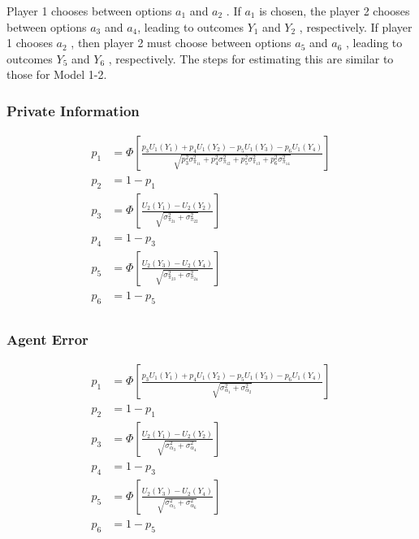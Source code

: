 \documentclass{article}
\begin{document}
    Player 1 chooses between options $a_{1}$ and $a_{2}$ . If $a_{1}$ is chosen, the player 2 chooses between
options $a_{3}$ and $a_{4}$, leading to outcomes $Y_{1}$ and $Y_{2}$ , respectively. If player 1 chooses $a_{2}$ , then player
2 must choose between options $a_{5}$ and $a_{6}$ , leading to outcomes $Y_{5}$ and $Y_{6}$ , respectively. The steps
for estimating this are similar to those for Model 1-2.

\subsubsection{Private Information}


\begin{align*}
p_{1} &= \Phi
\left[
  \frac{p_{3} U_{1}(Y_{1}) + p_{4} U_{1}(Y_{2}) - p_{5} U_{1}(Y_{3}) - p_{6} U_{1}(Y_{4})}
  {\sqrt{ p_{3}^{2} \sigma^{2}_{\pi_{11}} + p_{4}^{2} \sigma^{2}_{\pi_{12}}  
+ p_{5}^{2} \sigma^{2}_{\pi_{13}} + p_{6}^{2} \sigma^{2}_{\pi_{14}}
} }
\right] \\
p_{2} &= 1 - p_{1} \\
p_{3} &= \Phi
\left[
    \frac{U_{2}(Y_{1}) - U_{2}(Y_{2})}{\sqrt{\sigma^{2}_{\pi_{21}} + \sigma^{2}_{\pi_{22}}}}    
\right] \\
p_{4} &= 1 - p_{3} \\
p_{5} &= \Phi
\left[
    \frac{U_{2}(Y_{3}) - U_{2}(Y_{4})}{\sqrt{\sigma^{2}_{\pi_{23}} + \sigma^{2}_{\pi_{24}}}}    
\right] \\
p_{6} &= 1 - p_{5} \\
\end{align*}

\subsubsection{Agent Error}

\begin{align*}
p_{1} &= \Phi
\left[
  \frac{p_{3} U_{1}(Y_{1}) + p_{4} U_{1}(Y_{2}) - p_{5} U_{1}(Y_{3}) - p_{6} U_{1}(Y_{4})}
  {\sqrt{ \sigma^{2}_{\alpha_{1}} + \sigma^{2}_{\alpha_{2}}}}
\right] \\
p_{2} &= 1 - p_{1} \\
p_{3} &= \Phi
\left[
    \frac{U_{2}(Y_{1}) - U_{2}(Y_{2})}{\sqrt{\sigma^{2}_{\alpha_{3}} + \sigma^{2}_{\alpha_{4}}}}    
\right] \\
p_{4} &= 1 - p_{3} \\
p_{5} &= \Phi
\left[
    \frac{U_{2}(Y_{3}) - U_{2}(Y_{4})}{\sqrt{\sigma^{2}_{\alpha_{5}} + \sigma^{2}_{\alpha_{6}}}}    
\right] \\
p_{6} &= 1 - p_{5} \\
\end{align*}
\end{document}

